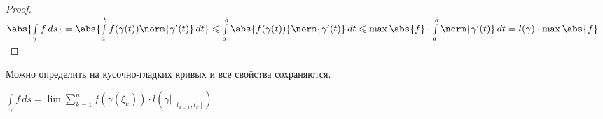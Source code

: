 \begin{properties}
\begin{enumerate}[1.]
		\begin{proof}\thmslashn
			
			$\abs{\int\limits_{\gamma} f\,ds} = \abs{\int\limits_{a}^{b} f(\gamma(t)) \norm{\gamma'(t)} \,dt} \leqslant \int\limits_{a}^{b} \abs{f(\gamma(t))} \norm{\gamma'(t)} \,dt \leqslant \max\abs{f}\cdot \int\limits_{a}^{b} \norm{\gamma'(t)}\,dt = l(\gamma) \cdot \max\abs{f}$
			
		\end{proof}
		
	\end{enumerate}

\end{properties}

\begin{remark}
	Можно определить на кусочно-гладких кривых и все свойства сохраняются.
\end{remark}

\begin{exerc}\thmslashn
	
	$\int\limits_{\gamma} f \,ds = \lim \sum\limits_{k=1}^n f(\gamma(\xi_k)) \cdot l(\gamma\Big|_{[t_{k-1}, t_k]})$
	
\end{exerc}